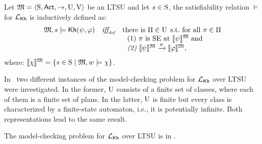     \begin{definition} \label{def:semantics-kh-uncertain}
        Let $\model = \tup{\S,\Act,\ra,\Unc,\V}$ be an LTSU and let $s\in\S$, the satisfiability relation $\models$ for $\Khlogic$ is inductively defined as:
        \[
        \begin{array}{l@{\ \ \ }c@{\ \ \  }l}
        \model, s \models \kh(\psi,\varphi) & \iffdef & \text{there is } \plans \in \Unc \;\text{s.t.\ for all } \plan\in\plans \\
        & & \ \ \text{\rm (1)} \ \plan \text{ is SE at }  \truthset{\model}{\psi}\; \text{and} \\
        & & \ \ \text{\em (2)} \ \truthset{\model}{\psi} \reach{\plan} \truthset{\model}{\varphi}, 
        \end{array}
        \]      
        where: $\truthset{\model}{\chi} = \csetsc{s\in\S}{\model,w\models\chi}$. 
    \end{definition}

    In~\cite{AFSVQ21,DF23} two different instances of the model-checking problem for $\Khlogic$ over LTSU were investigated. In the former, $\Unc$ consists of a finite set of classes, where each of them is a finite set of plans. In the latter, $\Unc$ is finite but every class is characterized by a finite-state automaton, i.e., it is potentially infinite. Both representations lead to the same result.

    \begin{proposition}
        The model-checking problem for $\Khlogic$ over LTSU is in \PTIME.
    \end{proposition}
